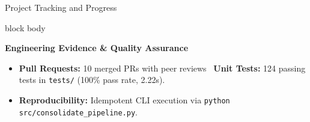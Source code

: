 \documentclass[aspectratio=169, 10pt]{beamer}
\newenvironment{card}[1][]{%
    \begin{beamercolorbox}[rounded=true,shadow=false,wd=\linewidth,sep=4pt,#1]{block body}%
}{%
    \end{beamercolorbox}%
}
\begin{document}
\begin{frame}{Project Tracking and Progress}
    \begin{card}
        {\fontsize{8pt}{9.5pt}\selectfont \textbf{\color{NavyPrimary}Engineering Evidence \& Quality Assurance}}\\[0.04cm]
        \begin{itemize}\setlength{\itemsep}{1.5pt}
            \item \textbf{Pull Requests:} 10 merged PRs with peer reviews \textbar\ \textbf{Unit Tests:} 124 passing tests in \texttt{tests/} (100\% pass rate, 2.22s).
            \item \textbf{Reproducibility:} Idempotent CLI execution via \texttt{python src/consolidate\_pipeline.py}.
        \end{itemize}
    \end{card}
\end{frame}
\end{document}
